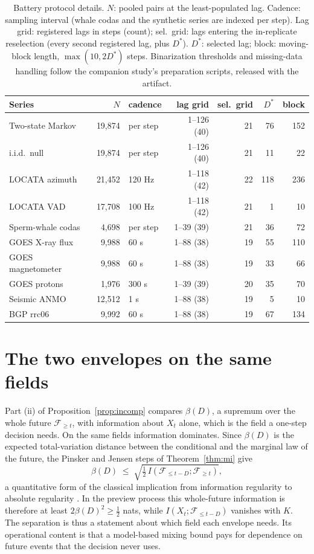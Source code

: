 \documentclass[11pt]{article}
\begin{document}
\begin{table}[h]\centering\footnotesize
\begin{tabular}{lrlrrrr}
\toprule
Series & $N$ & cadence & lag grid & sel.\ grid & $D^*$ & block \\
\midrule
Two-state Markov & 19,874 & per step & 1--126 (40) & 21 & 76 & 152 \\
i.i.d.\ null & 19,874 & per step & 1--126 (40) & 21 & 11 & 22 \\
LOCATA azimuth & 21,452 & 120 Hz & 1--118 (42) & 22 & 118 & 236 \\
LOCATA VAD & 17,708 & 100 Hz & 1--118 (42) & 21 & 1 & 10 \\
Sperm-whale codas & 4,698 & per step & 1--39 (39) & 21 & 36 & 72 \\
GOES X-ray flux & 9,988 & 60 s & 1--88 (38) & 19 & 55 & 110 \\
GOES magnetometer & 9,988 & 60 s & 1--88 (38) & 19 & 33 & 66 \\
GOES protons & 1,976 & 300 s & 1--39 (39) & 20 & 35 & 70 \\
Seismic ANMO & 12,512 & 1 s & 1--88 (38) & 19 & 5 & 10 \\
BGP rrc06 & 9,992 & 60 s & 1--88 (38) & 19 & 67 & 134 \\
\bottomrule
\end{tabular}
\caption{Battery protocol details. $N$: pooled pairs at the least-populated lag. Cadence: sampling interval (whale codas and the synthetic series are indexed per step). Lag grid: registered lags in steps (count); sel.\ grid: lags entering the in-replicate reselection (every second
registered lag, plus $D^*$). $D^*$: selected lag; block: moving-block length, $\max(10,2D^*)$ steps. Binarization thresholds and missing-data handling follow the companion study's preparation scripts, released with the artifact.}
\label{tab:details}
\end{table}

\FloatBarrier
\section{The two envelopes on the same fields}\label{app:samefield}

Part (ii) of Proposition~\ref{prop:incomp} compares $\beta(D)$, a supremum
over the whole future $\mathcal F_{\ge t}$, with information about $X_t$
alone, which is the field a one-step decision needs. On the same fields
information dominates. Since $\beta(D)$ is the expected total-variation
distance between the conditional and the marginal law of the future, the
Pinsker and Jensen steps of Theorem~\ref{thm:mi} give
\[
\beta(D)\;\le\;\sqrt{\tfrac12\,I(\mathcal F_{\le t-D};\mathcal F_{\ge t})},
\]
a quantitative form of the classical implication from information
regularity to absolute regularity \cite[Sec.~2]{bradley05}. In the preview
process this whole-future information is therefore at least
$2\beta(D)^2\ge\tfrac12$ nats, while $I(X_t;\mathcal F_{\le t-D})$ vanishes
with $K$. The separation is thus a statement about which field each
envelope needs. Its operational content is that a model-based mixing bound
pays for dependence on future events that the decision never uses.
\end{document}
